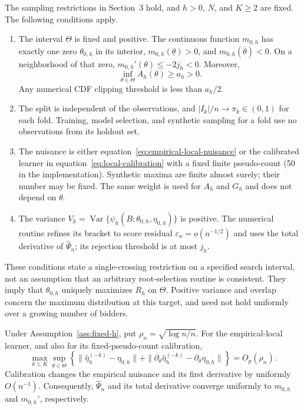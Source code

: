 \begin{assumption}
\label{ass:fixed-h}
The sampling restrictions in Section~3 hold, and $h>0$, $N$, and $K\geq2$
are fixed. The following conditions apply.
\begin{enumerate}
\item The interval $\Theta$ is fixed and positive. The continuous function
$m_{0,h}$ has exactly one zero $\theta_{0,h}$ in its interior,
$m_{0,h}(\underline\theta)>0$, and $m_{0,h}(\overline\theta)<0$.
On a neighborhood of that zero, $m_{0,h}'(\theta)\leq-2j_h<0$.
Moreover,
\begin{equation}
\inf_{\theta\in\Theta}A_h(\theta)\geq a_h>0.
\label{eq:local-cdf-overlap}
\end{equation}
Any numerical CDF clipping threshold is less than $a_h/2$.
\item The split is independent of the observations, and
$|I_k|/n\to\pi_k\in(0,1)$ for each fold. Training, model selection, and
synthetic sampling for a fold use no observations from its holdout set.
\item The nuisance is either equation~\eqref{eq:empirical-local-nuisance}
or the calibrated learner in equation~\eqref{eq:local-calibration} with a
fixed finite pseudo-count (50 in the implementation). Synthetic maxima are
finite almost surely; their number may be fixed. The same weight is used for
$A_h$ and $G_h$ and does not depend on $\theta$.
\item The variance
$V_h=\operatorname{Var}\{\psi_h(B;\theta_{0,h},\eta_{0,h})\}$ is positive.
The numerical routine refines its bracket to score residual
$\varepsilon_n=o(n^{-1/2})$ and uses the total derivative of
$\widehat\Psi_n$; its rejection threshold is at most $j_h$.
\end{enumerate}
\end{assumption}

These conditions state a single-crossing restriction on a specified search
interval, not an assumption that an arbitrary root-selection routine is
consistent. They imply that $\theta_{0,h}$ uniquely maximizes $R_h$ on
$\Theta$. Positive variance and overlap concern the maximum distribution at
this target, and need not hold uniformly over a growing number of bidders.

\begin{proposition}
\label{prop:empirical-local-rate}
Under Assumption~\ref{ass:fixed-h}, put $\rho_n=\sqrt{\log n/n}$. For the
empirical-local learner, and also for its fixed-pseudo-count calibration,
\begin{equation}
\max_{k\leq K}\sup_{\theta\in\Theta}
\left\{\|\widehat\eta_h^{(-k)}-\eta_{0,h}\|
+\|\partial_\theta\widehat\eta_h^{(-k)}
-\partial_\theta\eta_{0,h}\|\right\}=O_p(\rho_n).
\label{eq:empirical-local-rate}
\end{equation}
Calibration changes the empirical nuisance and its first derivative by
uniformly $O(n^{-1})$.
Consequently, $\widehat\Psi_n$ and its total derivative converge uniformly to
$m_{0,h}$ and $m_{0,h}'$, respectively.
\end{proposition}

